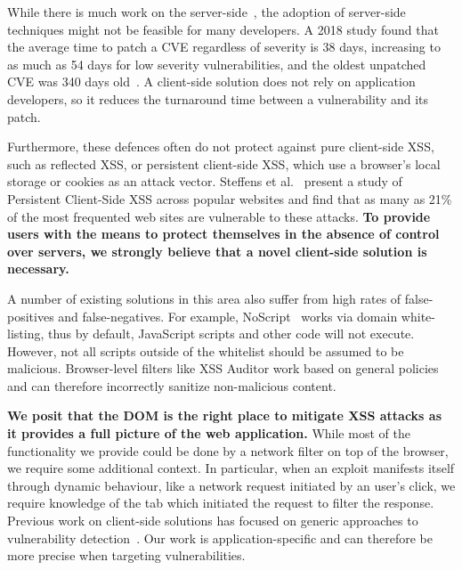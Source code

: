 While there is much work on the server-side~\cite{Xu:2006:TPE:1267336.1267345,DBLP:conf/sec/Nguyen-TuongGGSE05,Pietraszek:2005:DAI:2146257.2146267,Bisht:2008:XPD:1428322.1428325}, the
adoption of server-side techniques might not be feasible for many
developers. A 2018 study found that the average time to patch a \ac{CVE}
regardless of severity is 38 days, increasing to as much as 54 days
for low severity vulnerabilities, and the oldest unpatched \ac{CVE} was 340
days old~\cite{Rapid7}. A client-side solution does not rely on
application developers, so it reduces the turnaround time
between a vulnerability and its patch.

Furthermore, these defences often do not protect against pure
client-side \ac{XSS}, such as reflected \ac{XSS}, or persistent
client-side \ac{XSS}, which use a browser's local storage or cookies
as an attack vector. Steffens et
al.~\cite{DBLP:conf/ndss/SteffensRJS19} present a study of Persistent
Client-Side \ac{XSS} across popular websites and find that as many as
21\% of the most frequented web sites are vulnerable to these attacks.
%
\textbf{To provide users with the means to protect themselves in the absence
of control over servers, we strongly believe that a novel client-side
solution is necessary.}

A number of existing solutions in this area also suffer from high
rates of false-positives and false-negatives. %
For example, NoScript~\cite{Noscript} works via domain white-listing, thus by
default, JavaScript scripts and other code will not execute. However,
not all scripts outside of the whitelist should be assumed to be
malicious. Browser-level filters like XSS Auditor work based on
general policies and can therefore incorrectly sanitize non-malicious
content.

\textbf{We posit that the DOM is the right place to mitigate XSS
  attacks as it provides a full picture of the web application.} While
most of the functionality we provide could be done by a network filter
on top of the browser, we require some additional context. In
particular, when an exploit manifests itself through dynamic
behaviour, like a network request initiated by an user's click, we
require knowledge of the tab which initiated the request to filter the
response. Previous work on client-side solutions has focused on
generic approaches to vulnerability
detection~\cite{Kirda:2009:CCS:2639535.2639808,Jim:2007:DSI:1242572.1242654,Hallaraker:2005:DMJ:1078029.1078861}. Our
work is application-specific and can therefore be more precise when
targeting vulnerabilities.

